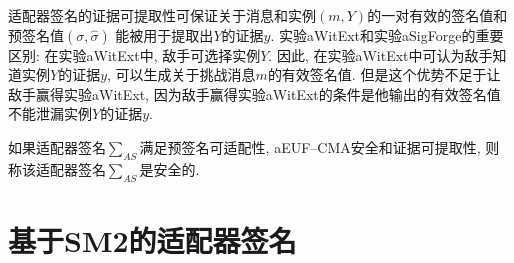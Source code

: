 \documentclass[review]{jcr}
\begin{document}
\begin{center}
\end{center}

适配器签名的证据可提取性可保证关于消息和实例$(m,Y)$的一对有效的签名值和预签名值$(\sigma,\hat{\sigma})$ 能被用于提取出$Y$的证据$y$. 实验aWitExt和实验aSigForge的重要区别: 在实验aWitExt中, 敌手可选择实例$Y$. 因此, 在实验aWitExt中可认为敌手知道实例$Y$的证据$y$, 可以生成关于挑战消息$m$的有效签名值. 但是这个优势不足于让敌手赢得实验aWitExt, 因为敌手赢得实验aWitExt的条件是他输出的有效签名值不能泄漏实例$Y$的证据$y$. 

\begin{definition}
如果适配器签名$\sum_{AS}$满足预签名可适配性, aEUF–CMA安全和证据可提取性, 则称该适配器签名$\sum_{AS}$是安全的.
\end{definition}


\section{基于SM2的适配器签名} 
\end{document}
